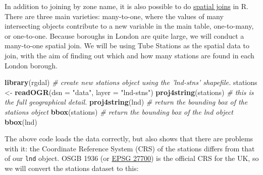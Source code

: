 \documentclass[]{article}
\newenvironment{Shaded}{}{}
\newcommand{\KeywordTok}[1]{\textcolor[rgb]{0.00,0.44,0.13}{\textbf{{#1}}}}
\newcommand{\DataTypeTok}[1]{\textcolor[rgb]{0.56,0.13,0.00}{{#1}}}
\newcommand{\StringTok}[1]{\textcolor[rgb]{0.25,0.44,0.63}{{#1}}}
\newcommand{\CommentTok}[1]{\textcolor[rgb]{0.38,0.63,0.69}{\textit{{#1}}}}
\newcommand{\NormalTok}[1]{{#1}}
\begin{document}
In addition to joining by zone name, it is also possible to do
\href{http://help.arcgis.com/en/arcgisdesktop/10.0/help/index.html\#//00080000000q000000}{spatial
joins} in R. There are three main varieties: many-to-one, where the
values of many intersecting objects contribute to a new variable in the
main table, one-to-many, or one-to-one. Because boroughs in London are
quite large, we will conduct a many-to-one spatial join. We will be
using Tube Stations as the spatial data to join, with the aim of finding
out which and how many stations are found in each London borough.

\begin{Shaded}
\begin{Highlighting}[]
\KeywordTok{library}\NormalTok{(rgdal)}
\CommentTok{# create new stations object using the 'lnd-stns' shapefile.}
\NormalTok{stations <- }\KeywordTok{readOGR}\NormalTok{(}\DataTypeTok{dsn =} \StringTok{"data"}\NormalTok{, }\DataTypeTok{layer =} \StringTok{"lnd-stns"}\NormalTok{)}
\KeywordTok{proj4string}\NormalTok{(stations)  }\CommentTok{# this is the full geographical detail.}
\KeywordTok{proj4string}\NormalTok{(lnd)}
\CommentTok{# return the bounding box of the stations object}
\KeywordTok{bbox}\NormalTok{(stations)}
\CommentTok{# return the bounding box of the lnd object}
\KeywordTok{bbox}\NormalTok{(lnd)}
\end{Highlighting}
\end{Shaded}
The above code loads the data correctly, but also shows that there are
problems with it: the Coordinate Reference System (CRS) of the stations
differs from that of our \texttt{lnd} object. OSGB 1936 (or
\href{http://spatialreference.org/ref/epsg/27700/}{EPSG 27700}) is the
official CRS for the UK, so we will convert the stations dataset to
this:
\end{document}
